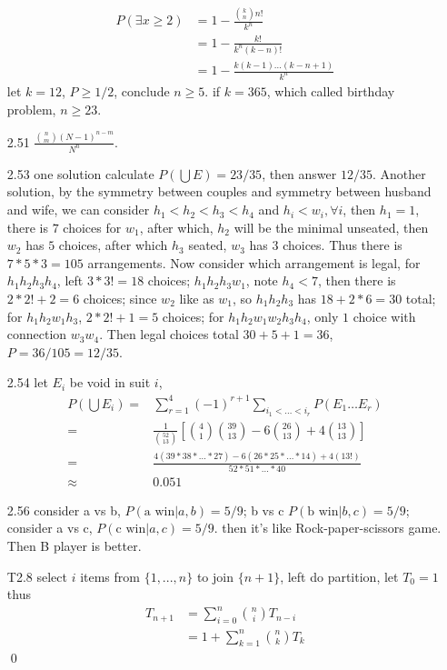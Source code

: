 \documentclass[paper=a4, fontsize=11pt]{scrartcl} %
\numberwithin{equation}{section} %
\numberwithin{figure}{section} %
\numberwithin{table}{section} %
\begin{document}
\begin{itemize}
	\begin{align}
	P(\exists x\geq 2) &= 1 - \frac{ {k \choose n}n! } { k^n } \\
		&=1 - \frac{k!}{k^n (k-n)!} \\
		&=1 - \frac{k(k-1)\dots (k-n+1)}{k^n}
	\end{align}
	let $k=12$, $P\geq 1/2$, conclude $n\geq 5$. if $k=365$, which called birthday problem, $n\geq 23$.
	\item[2.51] $\frac{ {n\choose m} (N-1)^{n-m}}{N^n}$.
	\item[2.53] one solution calculate $P(\bigcup E) = 23/35$, then answer $12/35$. Another solution, by the symmetry between couples and symmetry between husband and wife, we can consider $h_1<h_2<h_3<h_4$ and $h_i<w_i, \forall i$, then $h_1=1$, there is $7$ choices for $w_1$, after which, $h_2$ will be the minimal unseated, then $w_2$ has $5$ choices, after which $h_3$ seated, $w_3$ has $3$ choices. Thus there is $7*5*3=105$ arrangements. Now consider which arrangement is legal, for $h_1h_2h_3h_4$, left $3*3!=18$ choices; $h_1h_2h_3w_1$, note $h_4<7$, then there is $2*2!+2=6$ choices; since $w_2$ like as $w_1$, so $h_1h_2h_3$ has $18+2*6=30$ total; for $h_1h_2w_1h_3$, $2*2! + 1=5$ choices; for $h_1h_2w_1w_2h_3h_4$, only $1$ choice with connection $w_3w_4$. Then legal choices total $30+5+1=36$, $P=36/105 = 12/35$.
	\item[2.54] let $E_i$ be void in suit $i$,
	\begin{align}
		P(\bigcup E_i) =& \sum_{r=1}^4 (-1)^{r+1} \sum_{i_1<\dots<i_r} P(E_1\dots E_r) \\
			=& \frac{1}{{52\choose 13}} \left[ {4\choose 1}{39\choose 13} -6 {26\choose 13} 
			 + 4 {13 \choose 13} \right] \\
			 =& \frac{4(39*38*\dots*27) - 6(26*25*\dots*14) + 4(13!)} { 52*51*\dots*40 }\\
			 \approx & 0.051
	\end{align}
	\item[2.56] consider a vs b, $P(\text{a win}| a,b) = 5/9$; b vs c $P(\text{b win}| b,c) = 5/9$; consider a vs c, $P(\text{c win}|a,c)= 5/9$. then it's like Rock-paper-scissors game. Then B player is better.
	\item[T2.8] select $i$ items from $\{1,...,n\}$ to join $\{n+1\}$, left do partition, let $T_0=1$ thus
	\begin{align}
		T_{n+1} &= \sum_{i=0}^n {n\choose i} T_{n-i} \\
			&= 1 + \sum_{k=1}^n {n\choose k} T_k
	\end{align}\qed

\end{itemize}
\end{document}
